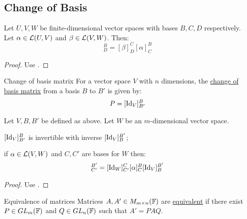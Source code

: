 \documentclass[../Main.tex]{subfiles}
\begin{document}
\subsection{Change of Basis}
\begin{proposition}
    Let $U, V, W$ be finite-dimensional vector spaces with bases $B, C, D$ respectively. Let $\alpha \in \mathcal{L}(U, V)$ and $\beta \in \mathcal{L}(V, W)$. Then:
    \begin{equation*}
        [\beta \circ \alpha]^B_D = [\beta]^C_D [\alpha]^B_C
    \end{equation*}
    \label{propComposeMatrices}
\end{proposition}
\begin{proof}
    Use .
\end{proof}
\begin{definition}{Change of basis matrix}
    For a vector space $V$ with $n$ dimensions, the \underline{change of basis matrix} from a basis $B$ to $B'$ is given by:
    \begin{equation*}
        P = [\operatorname{Id}_V]^B_{B'}
    \end{equation*}
\end{definition}
\begin{propositions}{
        Let $V, B, B'$ be defined as above. Let $W$ be an $m$-dimensional vector space.
        \label{propsChangeBasisCompose}
    }
    \item $[\operatorname{Id}_V]^B_{B'}$ is invertible with inverse $[\operatorname{Id}_V]^{B'}_B$;
    \item if $\alpha \in \mathcal{L}(V, W)$ and $C, C'$ are bases for $W$ then:
        \begin{equation*}
            [\alpha]^{B'}_{C'} = [\Id_W]^{C}_{C'} [\alpha]^B_C [\Id_V]^{B'}_B
        \end{equation*}
\end{propositions}
\begin{proof}
    Use .
\end{proof}
\begin{definition}{Equivalence of matrices}
    Matrices $A, A' \in M_{m\times n}(\mathbb{F})$ are \underline{equivalent} if there exist $P \in GL_m(\mathbb{F})$ and $Q \in GL_n(\mathbb{F})$ such that $A' = PAQ$.
\end{definition}
\end{document}
